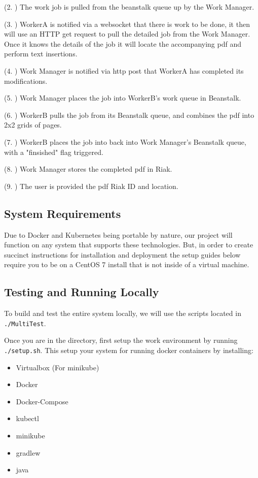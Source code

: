\documentclass[onecolumn, draftclsnofoot,10pt, compsoc]{IEEEtran}
\begin{document}
(2. ) The work job is pulled from the beanstalk queue up by the Work Manager.

(3. ) WorkerA is notified via a websocket that there is work to be done, it then will use an HTTP get request to pull the detailed job from the Work Manager. Once it knows the details of the job it will locate the accompanying pdf and perform text insertions.

(4. ) Work Manager is notified via http post that WorkerA has completed its modifications.

(5. ) Work Manager places the job into WorkerB's work queue in Beanstalk.

(6. ) WorkerB pulls the job from its Beanstalk queue, and combines the pdf into 2x2 grids of pages. 

(7. ) WorkerB places the job into back into Work Manager's Beanstalk queue, with a "finsished" flag triggered.

(8. ) Work Manager stores the completed pdf in Riak.

(9. ) The user is provided the pdf Riak ID and location.

\subsection{System Requirements}
Due to Docker and Kubernetes being portable by nature, our project will function on any system that supports these technologies. But, in order to create succinct instructions for installation and deployment the setup guides below require you to be on a CentOS 7 install that is not inside of a virtual machine.

\subsection{Testing and Running Locally}\label{testing-and-running-locally}

To build and test the entire system locally, we will use the scripts
located in \texttt{./MultiTest}.

Once you are in the directory, first setup the work environment by
running \texttt{./setup.sh}. This setup your system for running docker
containers by installing:

\begin{itemize}
\item
  Virtualbox (For minikube)
\item
  Docker
\item
  Docker-Compose
\item
  kubectl
\item
  minikube
\item
  gradlew
\item
  java
\end{itemize}
\end{document}

